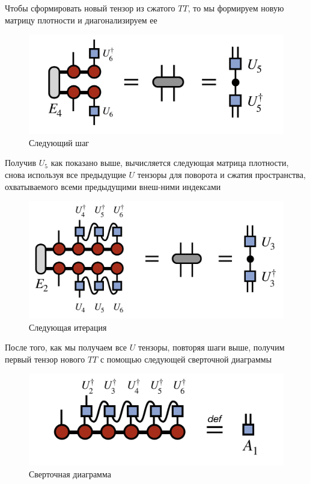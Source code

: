 Чтобы сформировать новый тензор из сжатого $\textit{TT}$, то мы формируем новую матрицу плотности и диагонализируем ее

\begin{figure}[h!tp]
\centering
\includegraphics[scale=0.3]{MatrixProductState_TensorTrain/diag_rho56.png}
\caption{Следующий шаг}
\label{fig:NextStepDiag}
\end{figure}

\newpage

Получив $U_5$ как показано выше, вычисляется следующая матрица плотности, снова используя все предыдущие $U$ тензоры для поворота и сжатия пространства, охватываемого всеми предыдущими внеш-ними индексами

\begin{figure}[h!tp]
\centering
\includegraphics[scale=0.3]{MatrixProductState_TensorTrain/diag_rho3456.png}
\caption{Следующая итерация}
\label{fig:NextIterDiag}
\end{figure}

После того, как мы получаем все $U$ тензоры, повторяя шаги выше, получим первый тензор нового $\textit{TT}$ с помощью следующей сверточной диаграммы

\begin{figure}[h!tp]
\centering
\includegraphics[scale=0.3]{MatrixProductState_TensorTrain/first_tensor.png}
\caption{Сверточная диаграмма}
\label{fig:ConvDiag}
\end{figure}

